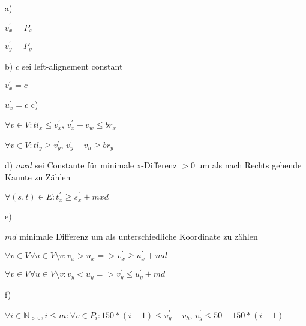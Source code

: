 \documentclass{article}
\begin{document}
a)

$v^{\prime}_{x} = P_{x}$

$v^{\prime}_{y} = P_{y}$

b)
$c$ sei left-alignement constant 

$v^{\prime}_{x} = c$

$u^{\prime}_{x} = c$
c)

$\forall v \in V:  tl_{x} \leq v^{\prime}_{x}$, $v^{\prime}_{x}+v_{w} \leq br_{x}$

$\forall v \in V:  tl_{y} \geq v^{\prime}_{y}$, $v^{\prime}_{y}-v_{h} \geq br_{y}$

d)
$mxd$ sei Constante für minimale x-Differenz $>0$ um als nach Rechts gehende Kannte zu Zählen

$\forall (s,t) \in E :  t^{\prime}_{x} \geq s^{\prime}_{x} + mxd$

e)

$md$ minimale Differenz um als unterschiedliche Koordinate zu zählen

$\forall v \in V \forall u \in V\setminus{v} : v_{x} > u_{x} => v_{x}^{\prime} \geq u_{x}^{\prime} + md$

$\forall v \in V \forall u \in V\setminus{v} : v_{y} < u_{y} => v_{y}^{\prime} \leq u_{y}^{\prime} + md$

f)

$\forall i \in \mathbb{N}_{>0}, i \leq m:\forall v \in P_{i} : 150*(i-1) \leq v_{y}^{\prime}-v_{h}$, $v_{y}^{\prime} \leq 50 + 150*(i-1)$
\end{document}
